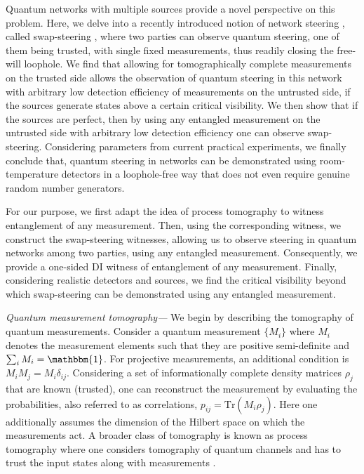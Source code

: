 \documentclass[pra,twocolumn,showpacs]{revtex4-2}
\newcommand{\Tr}[1]{\mathrm{Tr}#1}
\newcommand{\I}{\mathbbm{1}}
\theoremstyle{plain}
\theoremstyle{definition}
\theoremstyle{remark}
\begin{document}
Quantum networks with multiple sources provide a novel perspective on this problem. Here, we delve into a recently introduced notion of network steering \cite{netstee}, called swap-steering \cite{Sarkar2024networkquantum}, where two parties can observe quantum steering, one of them being trusted, with single fixed measurements, thus readily closing the free-will loophole. We find that allowing for tomographically complete measurements on the trusted side allows the observation of quantum steering in this network with arbitrary low detection efficiency of measurements on the untrusted side, if the sources generate states above a certain critical visibility. We then show that if the sources are perfect, then by using any entangled measurement on the untrusted side with arbitrary low detection efficiency one can observe swap-steering. Considering parameters from current practical experiments, we finally conclude that, quantum steering in networks can be demonstrated using room-temperature detectors in a loophole-free way that does not even require genuine random number generators.

For our purpose, we first adapt the idea of process tomography \cite{tomo1, tomo2, tomo3, tomo4,tomo5,tomo6} to witness entanglement of any measurement. Then, using the corresponding witness, we construct the swap-steering witnesses, allowing us to observe steering in quantum networks among two parties, using any entangled measurement. Consequently, we provide a one-sided DI witness of entanglement of any measurement. Finally, considering realistic detectors and sources, we find the critical visibility beyond which swap-steering can be demonstrated using any entangled measurement.

{\it{Quantum measurement tomography---}} We begin by describing the tomography of quantum measurements. %
Consider a quantum measurement $\{M_i\}$ where $M_i$ denotes the measurement elements such that they are positive semi-definite and $\sum_iM_i=\I$. For projective measurements, an additional condition is $M_iM_j=M_i\delta_{ij}$. Considering a set of informationally complete density matrices $\rho_j$ that are known (trusted), one can reconstruct the measurement by evaluating the probabilities, also referred to as correlations, $p_{ij}=\Tr(M_i\rho_j)$. %
Here one additionally assumes the dimension of the Hilbert space on which the measurements act. A broader class of tomography is known as process tomography where one considers tomography of quantum channels and has to trust the input states along with measurements \cite{tomo1, tomo2, tomo3, tomo4,tomo5,tomo6}.
\end{document}
